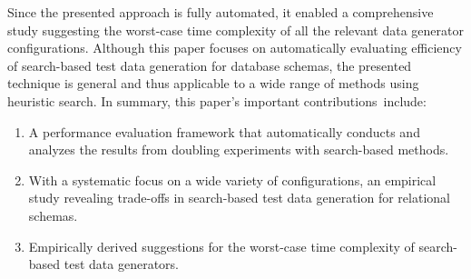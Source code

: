 Since the presented approach is fully automated, it enabled a comprehensive study suggesting the worst-case time
complexity of all the relevant data generator configurations. Although this paper focuses on automatically evaluating
efficiency of search-based test data generation for database schemas, the presented technique is general and thus
applicable to a wide range of methods using heuristic search. In summary, this paper's important \mbox{contributions
include}:



\begin{enumerate}
  \itemsep0in

  \item A performance evaluation framework that automatically conducts and analyzes the results from doubling
    experiments with search-based methods.

  \item With a systematic focus on a wide variety of configurations, an empirical study revealing trade-offs
    in search-based test data generation for relational schemas.

  \item Empirically derived suggestions for the worst-case time complexity of search-based test data generators.

  \end{enumerate}
  \vspace*{-.15in}
